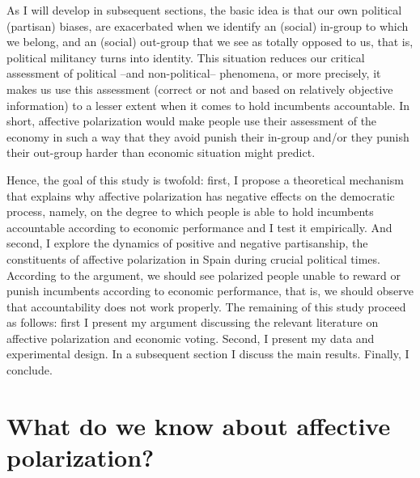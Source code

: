 \documentclass[a4paper, svgnames]{article}
\begin{document}
As I will develop in subsequent sections, the basic idea is that our own political (partisan) biases, are exacerbated when we identify an (social) in-group to which we belong, and an (social) out-group that we see as totally opposed to us, that is, political militancy turns into identity. This situation reduces our critical assessment of political --and non-political-- phenomena, or more precisely, it makes us use this assessment (correct or not and based on relatively objective information) to a lesser extent when it comes to hold incumbents accountable. In short, affective polarization would make people use their assessment of the economy in such a way that they avoid punish their in-group and/or they punish their out-group harder than economic situation might predict.

Hence, the goal of this study is twofold: first, I propose a theoretical mechanism that explains why affective polarization has negative effects on the democratic process, namely, on the degree to which people is able to hold incumbents accountable according to economic performance and I test it empirically. And second, I explore the dynamics of positive and negative partisanship, the constituents of affective polarization in Spain during crucial political times. According to the argument, we should see polarized people unable to reward or punish incumbents according to economic performance, that is, we should observe that accountability does not work properly. The remaining of this study proceed as follows: first I present my argument discussing the relevant literature on affective polarization and economic voting. Second, I present my data and experimental design. In a subsequent section I discuss the main results. Finally, I conclude.

\section{What do we know about affective polarization?}
\label{affective polarization}
\end{document}
